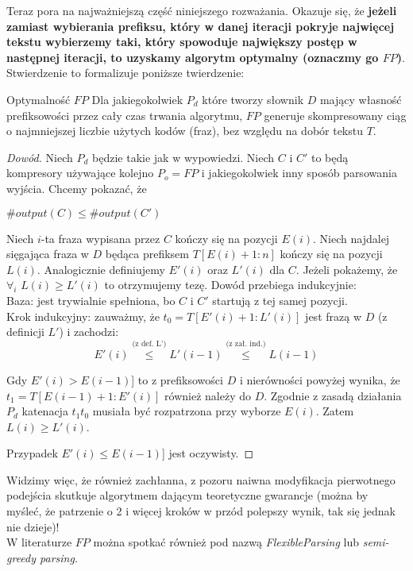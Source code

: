 Teraz pora na najważniejszą część niniejszego rozważania. Okazuje się, że \textbf{jeżeli zamiast wybierania prefiksu, który w danej iteracji pokryje najwięcej tekstu wybierzemy taki, który spowoduje największy postęp w następnej iteracji, to uzyskamy algorytm optymalny (oznaczmy go $FP$)}. Stwierdzenie to formalizuje poniższe twierdzenie:

\begin{theorem}{}{Optymalność $FP$ \cite{DBLP:conf/soda/MatiasS99}}
Dla jakiegokolwiek $P_{d}$ które tworzy słownik $D$ mający własność prefiksowości przez cały czas trwania algorytmu, $FP$ generuje skompresowany ciąg o najmniejszej liczbie użytych kodów (fraz), bez względu na dobór tekstu $T$.
\end{theorem}
\begin{proof}[Dowód]
Niech $P_{d}$ będzie takie jak w wypowiedzi. Niech $C$ i $C'$ to będą kompresory używające kolejno $P_{o} = FP$ i jakiegokolwiek inny sposób parsowania wyjścia. Chcemy pokazać, że \begin{center}
$\#output(C) \leq \#output(C')$
\end{center}

Niech $i$-ta fraza wypisana przez $C$ kończy się na pozycji $E(i)$. 
Niech najdalej sięgająca fraza w $D$ będąca prefiksem $T[E(i)+1:n]$ kończy się na pozycji $L(i)$.
Analogicznie definiujemy $E'(i)$ oraz $L'(i)$ dla $C$.
Jeżeli pokażemy, że $\forall_{i}$ $L(i) \geq L'(i)$ to otrzymujemy tezę. Dowód przebiega indukcyjnie:\\
Baza: jest trywialnie spełniona, bo $C$ i $C'$ startują z tej samej pozycji.\\
Krok indukcyjny: zauważmy, że $t_{0} = T[E'(i)+1:L'(i)]$ jest frazą w $D$ (z definicji $L'$) i zachodzi: 
\[E'(i) \overset{\text{(z def. L')}}{\leq} L'(i-1) \overset{\text{(z zał. ind.)}}{\leq} L(i-1) \]

Gdy $E'(i) > E(i-1)$] to z prefiksowości $D$ i nierówności powyżej wynika, że $t_{1} = T[E(i-1)+1:E'(i)]$ również należy do $D$. Zgodnie z zasadą działania $P_{d}$ katenacja $t_{1}t_{0}$ musiała być rozpatrzona przy wyborze $E(i)$. Zatem $L(i) \geq L'(i)$.

Przypadek $E'(i) \leq E(i-1)$] jest oczywisty.
\end{proof}
Widzimy więc, że również zachłanna, z pozoru naiwna modyfikacja pierwotnego podejścia skutkuje algorytmem dającym teoretyczne gwarancje (można by myśleć, że patrzenie o 2 i więcej kroków w przód polepszy wynik, tak się jednak nie dzieje)! \\ W literaturze $FP$ można spotkać również pod nazwą \textit{FlexibleParsing} lub \textit{semi-greedy parsing}.
